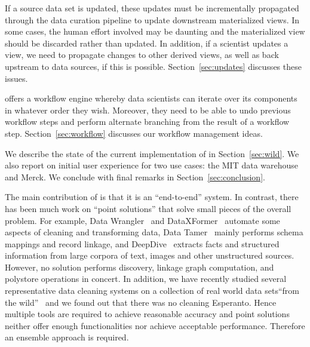 \stitle{[Updates.]}  If a source data set is updated, these updates must be
incrementally propagated through the data curation pipeline to update downstream
materialized views.  In some cases, the human effort involved may be daunting
and the materialized view should be discarded rather than updated.  In addition,
if a scientist updates a view, we need to propagate changes to other derived
views, as well as back upstream to data sources, if this is possible.
Section~\ref{sec:updates} discusses these  issues.



\stitle{[Workflow.]} \dcv offers a workflow engine whereby data scientists can
iterate over its components in whatever order they wish. Moreover, they
need to be able to undo previous workflow steps and perform alternate branching
from the result of a workflow step.  Section~\ref{sec:workflow} discusses our
workflow management ideas.

\smallskip

We describe the state of the current implementation of \dcv in
Section~\ref{sec:wild}. We also report on initial user experience for two use
cases: the MIT data warehouse and Merck. We conclude with final remarks in Section~\ref{sec:conclusion}.

\smallskip
The main contribution of \dcv is that it is an ``end-to-end'' system. In
contrast, there has been much work on ``point solutions'' that solve small
pieces of the overall problem. For example, Data Wrangler~\cite{2011-wrangler}
and DataXFormer~\cite{DBLP:conf/icde/AbedjanMIOPS16} automate some aspects of
cleaning and transforming data, Data
Tamer~\cite{DBLP:conf/cidr/StonebrakerBIBCZPX13} mainly performs schema mappings
and record linkage, and DeepDive~\cite{DBLP:journals/pvldb/ShinWWSZR15} extracts
facts and structured information from large corpora of text, images and other
unstructured sources. However, no solution performs  discovery, linkage graph
computation, and polystore operations in concert. In addition, we have recently
studied several representative data cleaning systems on a collection of real
world data sets``from the wild''~\cite{DBLP:journals/pvldb/AbedjanCDFIOPST16}
and we found out that there was no cleaning Esperanto. Hence multiple tools are
required to achieve reasonable accuracy and point solutions neither offer enough
functionalities nor achieve acceptable performance. Therefore an ensemble
approach is required.

